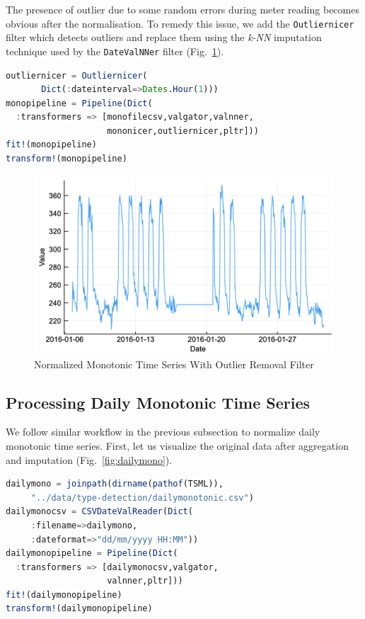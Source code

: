 \documentclass{juliacon}
\begin{document}
The presence of outlier due to some random errors during meter reading  becomes obvious after the normalisation. To remedy this issue, we add the \texttt{Outliernicer} filter which detects outliers and replace them  using the \emph{k-NN} imputation technique used by the \texttt{DateValNNer} filter (Fig.~\ref{fig:outnicer}).

\begin{lstlisting}[language = Julia]
outliernicer = Outliernicer(
       Dict(:dateinterval=>Dates.Hour(1)))
monopipeline = Pipeline(Dict(
  :transformers => [monofilecsv,valgator,valnner,
                    mononicer,outliernicer,pltr]))
fit!(monopipeline)
transform!(monopipeline)
\end{lstlisting}

\begin{figure}[htbp]
   \centering
   \includegraphics[width=\columnwidth]{outnicer.png} %
   \caption{Normalized Monotonic Time Series With Outlier Removal Filter}
   \label{fig:outnicer}
\end{figure}

\subsection{Processing Daily Monotonic Time Series}
We follow similar workflow in the previous subsection to normalize daily monotonic time series. First, let us visualize the original data after aggregation and imputation (Fig.~\ref{fig:dailymono}). 

\begin{lstlisting}[language = Julia]
dailymono = joinpath(dirname(pathof(TSML)),
     "../data/type-detection/dailymonotonic.csv")
dailymonocsv = CSVDateValReader(Dict(
     :filename=>dailymono,
     :dateformat=>"dd/mm/yyyy HH:MM"))
dailymonopipeline = Pipeline(Dict(
  :transformers => [dailymonocsv,valgator,
                    valnner,pltr]))
fit!(dailymonopipeline)
transform!(dailymonopipeline)
\end{lstlisting}
\end{document}
